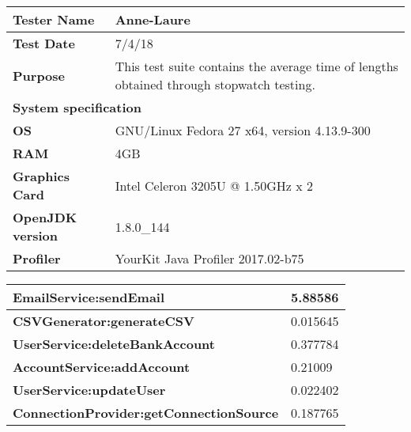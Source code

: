 \begin{longtable}{|m{4cm}|l|}
\hline
\cellcolor[HTML]{C0C0C0}\textbf{Tester Name} & \multicolumn{1}{p{13cm}|}{Anne-Laure}\\ \hline
\cellcolor[HTML]{C0C0C0}\textbf{Test Date} & \multicolumn{1}{p{13cm}|}{7/4/18}\\ \hline
\cellcolor[HTML]{C0C0C0}\textbf{Purpose} & \multicolumn{1}{p{13cm}|}{This test suite contains the average time of lengths obtained through stopwatch testing.}\\ \hline
\multicolumn{2}{|l|}{\cellcolor[HTML]{C0C0C0}\textbf{System specification}}\\ \hline
\cellcolor[HTML]{C0C0C0}\textbf{OS} & \multicolumn{1}{p{13cm}|}{GNU/Linux Fedora 27 x64, version 4.13.9-300}\\ \hline
\cellcolor[HTML]{C0C0C0}\textbf{RAM} & \multicolumn{1}{p{13cm}|}{4GB}\\ \hline
\cellcolor[HTML]{C0C0C0}\textbf{Graphics Card} & \multicolumn{1}{p{13cm}|}{Intel Celeron 3205U @ 1.50GHz x 2}\\ \hline
\cellcolor[HTML]{C0C0C0}\textbf{OpenJDK version} & \multicolumn{1}{p{13cm}|}{1.8.0\_144}\\ \hline
\cellcolor[HTML]{C0C0C0}\textbf{Profiler} & \multicolumn{1}{p{13cm}|}{YourKit Java Profiler 2017.02-b75}\\ \hline
\end{longtable}

\begin{longtable}{|m{9cm}|l|}
\hline
\cellcolor[HTML]{C0C0C0}\textbf{EmailService:sendEmail} & \multicolumn{1}{p{8cm}|}{5.88586}\\ \hline
\cellcolor[HTML]{C0C0C0}\textbf{CSVGenerator:generateCSV} & \multicolumn{1}{p{8cm}|}{0.015645}\\ \hline
\cellcolor[HTML]{C0C0C0}\textbf{UserService:deleteBankAccount} & \multicolumn{1}{p{8cm}|}{0.377784}\\ \hline
\cellcolor[HTML]{C0C0C0}\textbf{AccountService:addAccount} & \multicolumn{1}{p{8cm}|}{0.21009}\\ \hline
\cellcolor[HTML]{C0C0C0}\textbf{UserService:updateUser} & \multicolumn{1}{p{8cm}|}{0.022402}\\ \hline
\cellcolor[HTML]{C0C0C0}\textbf{ConnectionProvider:getConnectionSource} & \multicolumn{1}{p{8cm}|}{0.187765}\\ \hline
\end{longtable}


